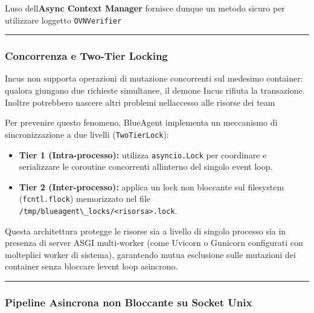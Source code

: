 L\textquotesingle uso dell\textquotesingle{}\textbf{Async Context
Manager} fornisce dunque un metodo sicuro per utilizzare
l\textquotesingle oggetto \passthrough{\lstinline!OVNVerifier!}

\begin{center}\rule{0.5\linewidth}{0.5pt}\end{center}

\subsubsection{Concorrenza e Two-Tier
Locking}\label{concorrenza-e-two-tier-locking}

Incus non supporta operazioni di mutazione concorrenti sul medesimo
container: qualora giungano due richieste simultanee, il demone Incus
rifiuta la transazione. Inoltre potrebbero nascere altri problemi
nell\textquotesingle accesso alle risorse dei team

Per prevenire questo fenomeno, BlueAgent implementa un meccanismo di
sincronizzazione a due livelli (\passthrough{\lstinline!TwoTierLock!}):

\begin{itemize}
\tightlist
\item
  \textbf{Tier 1 (Intra-processo):} utilizza
  \passthrough{\lstinline!asyncio.Lock!} per coordinare e serializzare
  le coroutine concorrenti all\textquotesingle interno del singolo event
  loop.
\item
  \textbf{Tier 2 (Inter-processo):} applica un lock non bloccante sul
  filesystem (\passthrough{\lstinline!fcntl.flock!}) memorizzato nel
  file \passthrough{\lstinline!/tmp/blueagent\_locks/<risorsa>.lock!}.
\end{itemize}

Questa architettura protegge le risorse sia a livello di singolo
processo sia in presenza di server ASGI multi-worker (come Uvicorn o
Gunicorn configurati con molteplici worker di sistema), garantendo mutua
esclusione sulle mutazioni dei container senza bloccare
l\textquotesingle event loop asincrono.

\begin{center}\rule{0.5\linewidth}{0.5pt}\end{center}

\subsubsection{Pipeline Asincrona non Bloccante su Socket
Unix}\label{pipeline-asincrona-non-bloccante-su-socket-unix}

